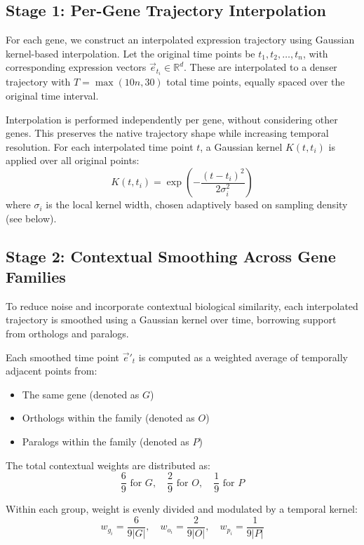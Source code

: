 \documentclass{article}
\begin{document}
\subsection{Stage 1: Per-Gene Trajectory Interpolation}

For each gene, we construct an interpolated expression trajectory using Gaussian kernel-based interpolation. Let the original time points be \( t_1, t_2, \dots, t_n \), with corresponding expression vectors \( \vec{e}_{t_i} \in \mathbb{R}^d \). These are interpolated to a denser trajectory with \( T = \max(10n, 30) \) total time points, equally spaced over the original time interval.

Interpolation is performed independently per gene, without considering other genes. This preserves the native trajectory shape while increasing temporal resolution. For each interpolated time point \( t \), a Gaussian kernel \( K(t, t_i) \) is applied over all original points:
\[
K(t, t_i) = \exp\left( -\frac{(t - t_i)^2}{2\sigma_i^2} \right)
\]
where \( \sigma_i \) is the local kernel width, chosen adaptively based on sampling density (see below).

\subsection{Stage 2: Contextual Smoothing Across Gene Families}

To reduce noise and incorporate contextual biological similarity, each interpolated trajectory is smoothed using a Gaussian kernel over time, borrowing support from orthologs and paralogs.

Each smoothed time point \( \vec{e}'_t \) is computed as a weighted average of temporally adjacent points from:
\begin{itemize}
  \item The same gene (denoted as \( G \))
  \item Orthologs within the family (denoted as \( O \))
  \item Paralogs within the family (denoted as \( P \))
\end{itemize}

The total contextual weights are distributed as:
\[
\frac{6}{9} \text{ for } G, \quad
\frac{2}{9} \text{ for } O, \quad
\frac{1}{9} \text{ for } P
\]

Within each group, weight is evenly divided and modulated by a temporal kernel:
\[
w_{g_i} = \frac{6}{9|G|}, \quad
w_{o_i} = \frac{2}{9|O|}, \quad
w_{p_i} = \frac{1}{9|P|}
\]
\end{document}
